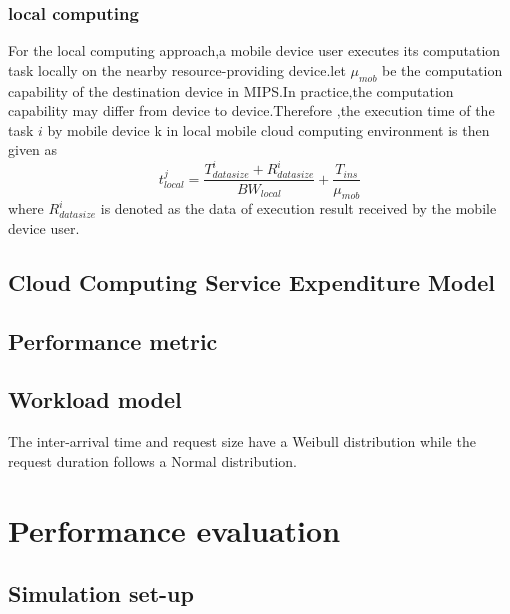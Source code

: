 \documentclass[review]{elsarticle}
\begin{document}
            \subsubsection{local computing}
            For the local computing approach,a mobile device user executes its computation task locally on the nearby resource-providing device.let \begin{math} \mu_{mob}\end{math} be the computation capability of the destination device in MIPS.In practice,the computation capability may differ from device to device.Therefore ,the execution time of the task \begin{math} i\end{math} by mobile device k in local mobile cloud computing environment is then given as \\
            $$ t_{local}^j = \frac{{T_{datasize}^i}+R_{datasize}^i}{BW_{local}}+\frac{T_{ins}}{\mu_{mob}}$$
            where \begin{math}R_{datasize}^i\end{math} is denoted as the data of execution result received by the mobile device user.
            
        \subsection{Cloud Computing Service Expenditure Model}
        
        \subsection{Performance metric}
        \subsection{Workload model}
        The inter-arrival time and request size have a Weibull distribution while the request duration follows a Normal distribution.\cite{iosup2008performance}
        \section{Performance evaluation}
            \subsection{Simulation set-up}
            \paragraph{}
        
\end{document}
